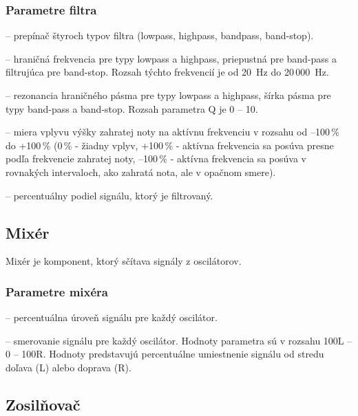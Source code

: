 \subsubsection{Parametre filtra}
\begin{description}
\setlength{\itemsep}{-0.5ex}
\item[Typ filtra] -- prepínač štyroch typov filtra (lowpass, highpass, bandpass, band-stop).
\item[Aktívna frekvencia] -- hraničná frekvencia pre typy lowpass a highpass, priepustná pre band-pass a filtrujúca pre band-stop. Rozsah týchto frekvencií je od 20~Hz do 20\,000~Hz.
\item[Q] -- rezonancia hraničného pásma pre typy lowpass a highpass, šírka pásma pre typy band-pass a band-stop. Rozsah parametra Q je 0 -- 10.
\item[Keyfollow] -- miera vplyvu výšky zahratej noty na aktívnu frekvenciu v rozsahu od --100\,\% do +100\,\% (0\,\% - žiadny vplyv, +100\,\% - aktívna frekvencia sa posúva presne podľa frekvencie zahratej noty, --100\,\% - aktívna frekvencia sa posúva v rovnakých intervaloch, ako zahratá nota, ale v opačnom smere).
\item[Mix] -- percentuálny podiel signálu, ktorý je filtrovaný.
\end{description}

\subsection{Mixér}

Mixér je komponent, ktorý sčítava signály z oscilátorov.

\subsubsection{Parametre mixéra}
\begin{description}
\setlength{\itemsep}{-0.5ex}
\item[Úroveň oscilátorov] -- percentuálna úroveň signálu pre každý oscilátor.
\item[Smerovanie oscilátorov] -- smerovanie signálu pre každý oscilátor. Hodnoty parametra sú v rozsahu 100L -- 0 -- 100R. Hodnoty predstavujú percentuálne umiestnenie signálu od stredu doľava (L) alebo doprava (R).
\end{description}

\subsection{Zosilňovač}

